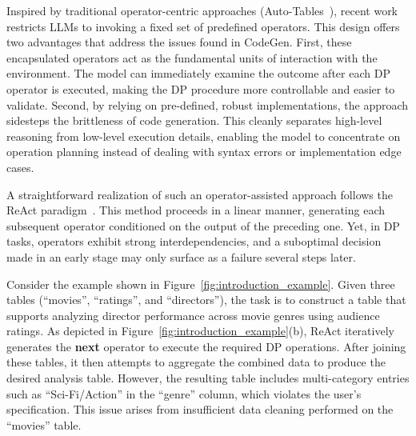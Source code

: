 Inspired by traditional operator-centric approaches (\eg Auto-Tables~\cite{DBLP:journals/pvldb/LiHYWC23}), recent work restricts LLMs to invoking a fixed set of predefined operators. This design offers two advantages that address the issues found in CodeGen.  
First, these encapsulated operators act as the fundamental units of interaction with the environment. The model can immediately examine the outcome after each DP operator is executed, making the DP procedure more controllable and easier to validate.  
Second, by relying on {pre-defined, robust implementations}, the approach sidesteps the brittleness of code generation. This cleanly separates high-level reasoning from low-level execution details, enabling the model to concentrate on {operation planning} instead of dealing with syntax errors or implementation edge cases.

A straightforward realization of such an operator-assisted approach follows the ReAct paradigm~\cite{aksitov2023rest}. This method proceeds in a linear manner, generating each subsequent operator conditioned on the output of the preceding one. Yet, in DP tasks, operators exhibit strong interdependencies, and a suboptimal decision made in an early stage may only surface as a failure several steps later.

\begin{example}
\label{exam:react_issue}
Consider the example shown in Figure~\ref{fig:introduction_example}. Given three tables (``{movies}'', ``{ratings}'', and ``{directors}''), the task is to construct a table that supports analyzing director performance across movie genres using audience ratings. 
As depicted in Figure~\ref{fig:introduction_example}(b), ReAct iteratively generates the \textbf{next} operator to execute the required DP operations. After joining these tables, it then attempts to aggregate the combined data to produce the desired analysis table. However, the resulting table includes multi-category entries such as ``Sci-Fi/Action'' in the ``genre'' column, which violates the user’s specification. This issue arises from insufficient data cleaning performed on the ``movies'' table.
\end{example}

